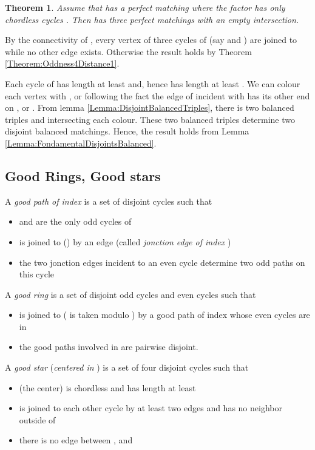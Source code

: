 \documentclass{elsart}
\theoremstyle{plain} \theoremheaderfont{\scshape}
\newtheorem{Thm}{\bf Theorem}
\newenvironment{Prf}{{\bf \noindent Proof } }{\hfill\\}
\begin{document}
\begin{Thm} \label{Theorem:4OddChordlessCycles}
Assume that  has a perfect matching  where the factor
 has only  chordless cycles . Then  has three perfect matchings with an
empty intersection.
\end{Thm}
\begin{Prf}
By the connectivity of , every vertex of three cycles of
 (say  and ) are joined to  while no
other edge exists. Otherwise the result holds by Theorem
\ref{Theorem:Oddness4Distance1}.

Each cycle of  has length at least  and, hence 
has length at least . We can colour each vertex  with
,  or  following the fact the edge of  incident with 
has its other end on ,  or . From lemma
\ref{Lemma:DisjointBalancedTriples}, there is two balanced triples
 and  intersecting  each colour. These two balanced triples
determine two disjoint balanced matchings. Hence, the result
holds from Lemma \ref{Lemma:FondamentalDisjointsBalanced}.
\end{Prf}

\subsection{Good Rings, Good stars}

A {\em good path of index } is a set  of  disjoint
cycles  such that

\begin{itemize}
  \item  and  are the only odd cycles of 
  \item  is joined to  ()  by an
  edge  (called {\em jonction edge of index })
  \item the two jonction edges incident to an even cycle
  determine two odd paths on this cycle
\end{itemize}



A {\em good ring} is a set  of disjoint odd cycles  and even cycles such that
\begin{itemize}
  \item  is joined to  ( is taken modulo ) by a
  good path  of index  whose even cycles are in 
  \item the good paths involved in  are pairwise disjoint.
\end{itemize}


A {\em good star} ({\em centered in }) is a set  of four
disjoint cycles  such that
\begin{itemize}
  \item  (the center) is chordless and has length at least 
  \item  is joined to each other cycle by at
  least two edges and has no neighbor outside of 
  \item there is no edge between ,  and 
\end{itemize}
\end{document}
